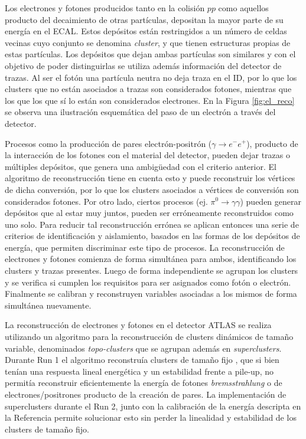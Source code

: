 Los electrones y fotones producidos tanto en la colisión $pp$ como aquellos producto del decaimiento de otras partículas, depositan la mayor parte de su energía en el ECAL. Estos depósitos están restringidos a un número de celdas vecinas cuyo conjunto se denomina \textit{cluster}, y que tienen estructuras propias de estas partículas. Los depósitos que dejan ambas partículas son similares y con el objetivo de poder distinguirlas se utiliza además información del detector de trazas. Al ser el fotón una partícula neutra no deja traza en el ID, por lo que los clusters que no están asociados a trazas son considerados fotones, mientras que los que los que sí lo están son considerados electrones. En la Figura \ref{fig:el_reco} se observa una ilustración esquemática del paso de un electrón a través del detector.



Procesos como la producción de pares electrón-positrón ($\gamma\to e^{-}e^{+}$), producto de la interacción de los fotones con el material del detector, pueden dejar trazas o múltiples depósitos, que genera una ambigüedad con el criterio anterior.
El algoritmo de reconstrucción tiene en cuenta esto y puede reconstruir los vértices de dicha conversión, por lo que los clusters asociados a vértices de conversión son considerados fotones. Por otro lado, ciertos procesos (ej. $\pi^{0}\to\gamma\gamma$) pueden generar depósitos que al estar muy juntos, pueden ser erróneamente reconstruidos como uno solo.
Para reducir tal reconstrucción errónea se aplican entonces una serie de criterios de identificación y aislamiento, basados en las formas de los depósitos de energía, que permiten discriminar este tipo de procesos.
La reconstrucción de electrones y fotones comienza de forma simultánea para ambos, identificando los clusters y trazas presentes. Luego de forma independiente se agrupan los clusters y se verifica si cumplen los requisitos para ser asignados como fotón o electrón. Finalmente se calibran y reconstruyen variables asociadas a los mismos de forma simultánea nuevamente.



La reconstrucción de electrones y fotones en el detector ATLAS se realiza utilizando un algoritmo para la reconstrucción de clusters dinámicos de tamaño variable, denominados \textit{topo-clusters} que se agrupan además en \textit{superclusters}\cite{EGAM-2018-01}. Durante Run 1 el algoritmo reconstruía clusters de tamaño fijo \cite{PERF-2013-04, PERF-2013-05, Lampl:1099735}, que si bien tenían una respuesta lineal energética y un estabilidad frente a pile-up, no permitía reconstruir eficientemente la energía de fotones \textit{bremsstrahlung} o de electrones/positrones producto de la creación de pares. La implementación de superclusters durante el Run 2, junto con la calibración de la energía descripta en la Referencia \cite{PERF-2017-03} permite solucionar esto sin perder la linealidad y estabilidad de los clusters de tamaño fijo.



